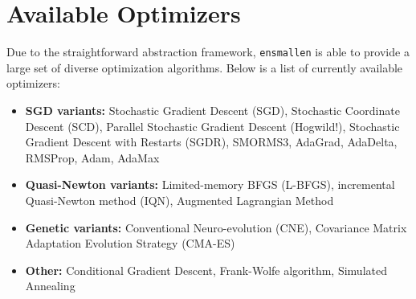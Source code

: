 \documentclass{article}
\begin{document}
\vspace*{-0.3em}
\section{Available Optimizers}
\vspace*{-0.5em}

Due to the straightforward abstraction framework, {\tt ensmallen} is able to
provide a large set of diverse optimization algorithms.  Below is a list of
currently available optimizers:

\vspace*{-0.4em}
\begin{itemize}
  \item {\bf SGD variants:} Stochastic Gradient Descent (SGD), Stochastic
      Coordinate Descent (SCD), Parallel Stochastic Gradient Descent (Hogwild!),
      Stochastic Gradient Descent with Restarts (SGDR), SMORMS3, AdaGrad,
      AdaDelta, RMSProp, Adam, AdaMax

  \item {\bf Quasi-Newton variants:} Limited-memory BFGS (L-BFGS), incremental
        Quasi-Newton method (IQN), Augmented Lagrangian Method

  \item {\bf Genetic variants:} Conventional Neuro-evolution (CNE), Covariance
        Matrix Adaptation Evolution Strategy (CMA-ES)

  \item {\bf Other:} Conditional Gradient Descent, Frank-Wolfe algorithm, Simulated Annealing

\end{itemize}
\vspace*{-0.4em}

\end{document}
